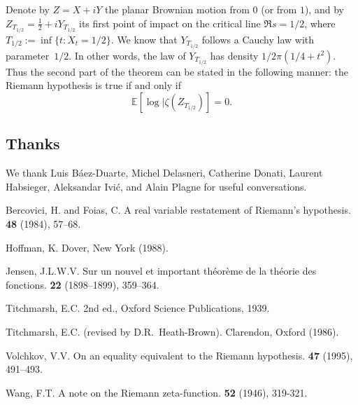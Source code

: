 \documentclass{article}
\begin{document}
Denote by $Z=X+iY$ the planar Brownian motion from $0$ (or from $1$), and by $Z_{T_{1/2}}=\frac12+iY_{T_{1/2}}$ its first point of impact on the critical line $\Re s=1/2$, where $T_{1/2}:=\inf\{t:X_t=1/2\}$.
We know that $Y_{T_{1/2}}$ follows a Cauchy law with parameter~$1/2$.
In other words, the law of $Y_{T_{1/2}}$ has density $1/2\pi(1/4+t^2)$.
Thus the second part of the theorem can be stated in the following manner: the Riemann hypothesis is true if and only if
\[
  \mathbb{E}[\log|\zeta(Z_{T_{1/2}})] = 0.
\]


\subsection*{Thanks}

We thank Luis B\'{a}ez-Duarte, Michel Delasneri, Catherine Donati, Laurent Habsieger, Aleksandar Ivi\'{c}, and Alain Plagne for useful conversations.



\nocite{*}

\begin{thebibliography}{7}

  {\sc Bercovici, H. and Foias, C.}
  \newblock A real variable restatement of Riemann's hypothesis.
   \textbf{48} (1984), 57--68.

  {\sc Hoffman, K.}
  \newblock Dover, New York (1988).

  {\sc Jensen, J.L.W.V.}
  \newblock Sur un nouvel et important th\'{e}or\`{e}me de la th\'{e}orie des fonctions.
   \textbf{22} (1898--1899), 359--364.

  {\sc Titchmarsh, E.C.}
  \newblock 2nd ed., Oxford Science Publications, 1939.

  {\sc Titchmarsh, E.C.}
   (revised by D.R.~Heath-Brown).
  \newblock Clarendon, Oxford (1986).

  {\sc Volchkov, V.V.}
  \newblock On an equality equivalent to the Riemann hypothesis.
   \textbf{47} (1995), 491--493.

  {\sc Wang, F.T.}
  \newblock A note on the Riemann zeta-function.
   \textbf{52} (1946), 319-321.

\end{thebibliography}
\end{document}
